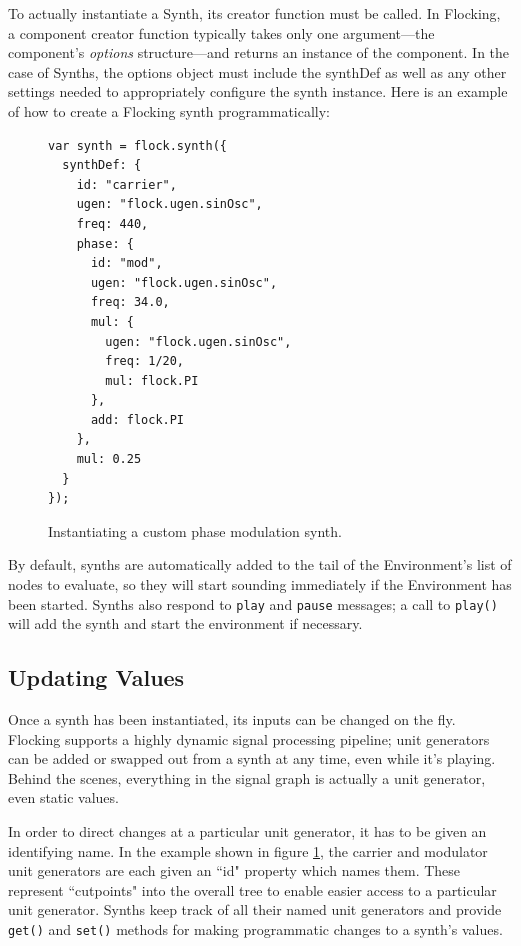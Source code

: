 \documentclass{article}
\begin{document}
To actually instantiate a Synth, its creator function must be called. In Flocking, a component creator function typically takes only one argument---the component's {\it options} structure---and returns an instance of the component. In the case of Synths, the options object must include the synthDef as well as any other settings needed to appropriately configure the synth instance. Here is an example of how to create a Flocking synth programmatically:

\begin{figure}[h!]
    \begin{verbatim}
var synth = flock.synth({
  synthDef: {
    id: "carrier",
    ugen: "flock.ugen.sinOsc",
    freq: 440,
    phase: {
      id: "mod",
      ugen: "flock.ugen.sinOsc",
      freq: 34.0,
      mul: {
        ugen: "flock.ugen.sinOsc",
        freq: 1/20,
        mul: flock.PI
      },
      add: flock.PI
    },
    mul: 0.25
  }
});
    \end{verbatim}
    \caption{Instantiating a custom phase modulation synth.\label{fig:pmSynth}}
\end{figure}


By default, synths are automatically added to the tail of the Environment's list of nodes to evaluate, so they will start sounding immediately if the Environment has been started. Synths also respond to \verb|play| and \verb|pause| messages; a call to \verb|play()| will add the synth and start the environment if necessary.

\subsection{Updating Values}

Once a synth has been instantiated, its inputs can be changed on the fly. Flocking supports a highly dynamic signal processing pipeline; unit generators can be added or swapped out from a synth at any time, even while it's playing. Behind the scenes, everything in the signal graph is actually a unit generator, even static values.

In order to direct changes at a particular unit generator, it has to be given an identifying name. In the example shown in figure \ref{fig:pmSynth}, the carrier and modulator unit generators are each given an ``id" property which names them. These represent ``cutpoints" into the overall tree to enable easier access to a particular unit generator. Synths keep track of all their named unit generators and provide \verb|get()| and \verb|set()| methods for making programmatic changes to a synth's values.
\end{document}

